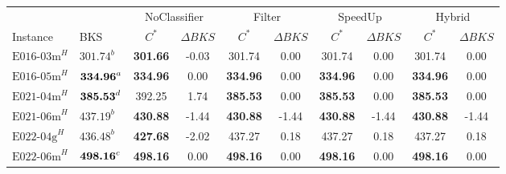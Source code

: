 \begin{table}[ht]
    \centering
    \scriptsize
    \renewcommand{\arraystretch}{1.02}
    \begin{tabular}{@{}llcccccccc@{}}
        \toprule
                            &                             & \multicolumn{2}{c}{NoClassifier} & \multicolumn{2}{c}{Filter} & \multicolumn{2}{c}{SpeedUp} & \multicolumn{2}{c}{Hybrid}                                                                    \\ \cmidrule(lr){3-4}\cmidrule(lr){5-6}\cmidrule(lr){7-8}\cmidrule(lr){9-10}
        Instance            & BKS                         & $C^*$                            & $\Delta BKS$               & $C^*$                       & $\Delta BKS$               & $C^*$            & $\Delta BKS$ & $C^*$           & $\Delta BKS$ \\
        \midrule
        $\text{E016-03m}^H$ & $\text{301.74}^b$           & \textbf{301.66}                  & -0.03                      & 301.74                      & 0.00                       & 301.74           & 0.00         & 301.74          & 0.00         \\
        $\text{E016-05m}^H$ & $\text{\textbf{334.96}}^a$  & \textbf{334.96}                  & 0.00                       & \textbf{334.96}             & 0.00                       & \textbf{334.96}  & 0.00         & \textbf{334.96} & 0.00         \\
        $\text{E021-04m}^H$ & $\text{\textbf{385.53}}^d$  & 392.25                           & 1.74                       & \textbf{385.53}             & 0.00                       & \textbf{385.53}  & 0.00         & \textbf{385.53} & 0.00         \\
        $\text{E021-06m}^H$ & $\text{437.19}^b$           & \textbf{430.88}                  & -1.44                      & \textbf{430.88}             & -1.44                      & \textbf{430.88}  & -1.44        & \textbf{430.88} & -1.44        \\
        $\text{E022-04g}^H$ & $\text{436.48}^b$           & \textbf{427.68}                  & -2.02                      & 437.27                      & 0.18                       & 437.27           & 0.18         & 437.27          & 0.18         \\
        $\text{E022-06m}^H$ & $\text{\textbf{498.16}}^c$  & \textbf{498.16}                  & 0.00                       & \textbf{498.16}             & 0.00                       & \textbf{498.16}  & 0.00         & \textbf{498.16} & 0.00         \\

\end{tabular}
\end{table}
